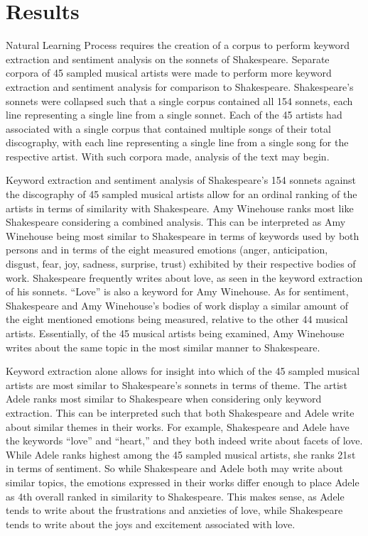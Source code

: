 \documentclass[10pt,a4paper]{article}
\begin{document}
\section{Results}
Natural Learning Process requires the creation of a corpus to perform keyword extraction and sentiment analysis on the sonnets of Shakespeare. Separate corpora of 45 sampled musical artists were made to perform more keyword extraction and sentiment analysis for comparison to Shakespeare. Shakespeare’s sonnets were collapsed such that a single corpus contained all 154 sonnets, each line representing a single line from a single sonnet. Each of the 45 artists had associated with a single corpus that contained multiple songs of their total discography, with each line representing a single line from a single song for the respective artist. With such corpora made, analysis of the text may begin.

\newpage


\noindent Keyword extraction and sentiment analysis of Shakespeare’s 154 sonnets against the discography of 45 sampled musical artists allow for an ordinal ranking of the artists in terms of similarity with Shakespeare. Amy Winehouse ranks most like Shakespeare considering a combined analysis. This can be interpreted as Amy Winehouse being most similar to Shakespeare in terms of keywords used by both persons and in terms of the eight measured emotions (anger, anticipation, disgust, fear, joy, sadness, surprise, trust) exhibited by their respective bodies of work. Shakespeare frequently writes about love, as seen in the keyword extraction of his sonnets. “Love” is also a keyword for Amy Winehouse. As for sentiment, Shakespeare and Amy Winehouse’s bodies of work display a similar amount of the eight mentioned emotions being measured, relative to the other 44 musical artists. Essentially, of the 45 musical artists being examined, Amy Winehouse writes about the same topic in the most similar manner to Shakespeare.



\noindent Keyword extraction alone allows for insight into which of the 45 sampled musical artists are most similar to Shakespeare’s sonnets in terms of theme. The artist Adele ranks most similar to Shakespeare when considering only keyword extraction. This can be interpreted such that both Shakespeare and Adele write about similar themes in their works. For example, Shakespeare and Adele have the keywords “love” and “heart,” and they both indeed write about facets of love. While Adele ranks highest among the 45 sampled musical artists, she ranks 21st in terms of sentiment. So while Shakespeare and Adele both may write about similar topics, the emotions expressed in their works differ enough to place Adele as 4th overall ranked in similarity to Shakespeare. This makes sense, as Adele tends to write about the frustrations and anxieties of love, while Shakespeare tends to write about the joys and excitement associated with love. 
\end{document}
